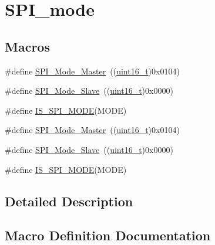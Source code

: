 \hypertarget{group___s_p_i__mode}{}\section{S\+P\+I\+\_\+mode}
\label{group___s_p_i__mode}
\subsection*{Macros}
\begin{DoxyCompactItemize}
\item 
\#define \hyperlink{group___s_p_i__mode_gaa9e47fb7c1d6c4655b72a00ed1f3b651}{S\+P\+I\+\_\+\+Mode\+\_\+\+Master}~((\hyperlink{_p_e___types_8h_a1f1825b69244eb3ad2c7165ddc99c956}{uint16\+\_\+t})0x0104)
\item 
\#define \hyperlink{group___s_p_i__mode_ga84621141413ee07cb2d2dc82da2baa42}{S\+P\+I\+\_\+\+Mode\+\_\+\+Slave}~((\hyperlink{_p_e___types_8h_a1f1825b69244eb3ad2c7165ddc99c956}{uint16\+\_\+t})0x0000)
\item 
\#define \hyperlink{group___s_p_i__mode_gad5135300763c75dbb446861536359f12}{I\+S\+\_\+\+S\+P\+I\+\_\+\+M\+O\+DE}(M\+O\+DE)
\item 
\#define \hyperlink{group___s_p_i__mode_gaa9e47fb7c1d6c4655b72a00ed1f3b651}{S\+P\+I\+\_\+\+Mode\+\_\+\+Master}~((\hyperlink{_p_e___types_8h_a1f1825b69244eb3ad2c7165ddc99c956}{uint16\+\_\+t})0x0104)
\item 
\#define \hyperlink{group___s_p_i__mode_ga84621141413ee07cb2d2dc82da2baa42}{S\+P\+I\+\_\+\+Mode\+\_\+\+Slave}~((\hyperlink{_p_e___types_8h_a1f1825b69244eb3ad2c7165ddc99c956}{uint16\+\_\+t})0x0000)
\item 
\#define \hyperlink{group___s_p_i__mode_gad5135300763c75dbb446861536359f12}{I\+S\+\_\+\+S\+P\+I\+\_\+\+M\+O\+DE}(M\+O\+DE)
\end{DoxyCompactItemize}


\subsection{Detailed Description}


\subsection{Macro Definition Documentation}
